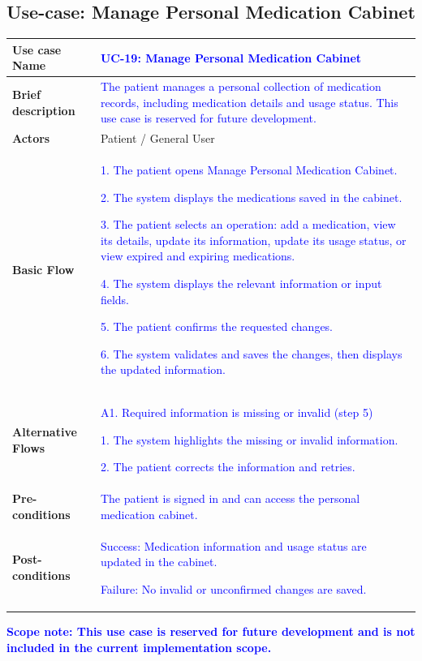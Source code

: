 \subsection{Use-case: Manage Personal Medication Cabinet}
\label{uc:uc-19}
\begin{longtable}{|p{}|p{}|}
\hline
\textbf{Use case Name} &
\textcolor{blue}{UC-19: Manage Personal Medication Cabinet}
\\ \hline
\textbf{Brief description} &
\textcolor{blue}{The patient manages a personal collection of medication records, including medication details and usage status. This use case is reserved for future development.}
\\ \hline
\textbf{Actors} &
Patient / General User
\\ \hline
\textbf{Basic Flow} &
\textcolor{blue}{1. The patient opens Manage Personal Medication Cabinet.}\par
\textcolor{blue}{2. The system displays the medications saved in the cabinet.}\par
\textcolor{blue}{3. The patient selects an operation: add a medication, view its details, update its information, update its usage status, or view expired and expiring medications.}\par
\textcolor{blue}{4. The system displays the relevant information or input fields.}\par
\textcolor{blue}{5. The patient confirms the requested changes.}\par
\textcolor{blue}{6. The system validates and saves the changes, then displays the updated information.}
\\ \hline
\textbf{Alternative Flows} &
\textcolor{blue}{A1. Required information is missing or invalid (step 5)}\par
\textcolor{blue}{1. The system highlights the missing or invalid information.}\par
\textcolor{blue}{2. The patient corrects the information and retries.}
\\ \hline
\textbf{Pre-conditions} &
\textcolor{blue}{The patient is signed in and can access the personal medication cabinet.}
\\ \hline
\textbf{Post-conditions} &
\textcolor{blue}{Success: Medication information and usage status are updated in the cabinet.}\par
\textcolor{blue}{Failure: No invalid or unconfirmed changes are saved.}
\\ \hline
\end{longtable}
\textcolor{blue}{\textbf{Scope note: This use case is reserved for future development and is not included in the current implementation scope.}}
